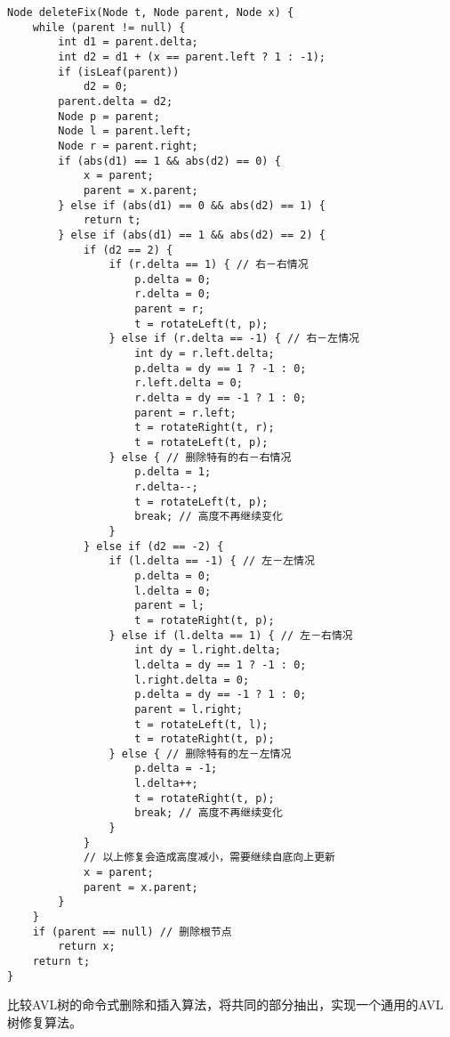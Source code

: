 \documentclass[UTF8]{article}
\begin{document}
\begin{lstlisting}
Node deleteFix(Node t, Node parent, Node x) {
    while (parent != null) {
        int d1 = parent.delta;
        int d2 = d1 + (x == parent.left ? 1 : -1);
        if (isLeaf(parent))
            d2 = 0;
        parent.delta = d2;
        Node p = parent;
        Node l = parent.left;
        Node r = parent.right;
        if (abs(d1) == 1 && abs(d2) == 0) {
            x = parent;
            parent = x.parent;
        } else if (abs(d1) == 0 && abs(d2) == 1) {
            return t;
        } else if (abs(d1) == 1 && abs(d2) == 2) {
            if (d2 == 2) {
                if (r.delta == 1) { // 右－右情况
                    p.delta = 0;
                    r.delta = 0;
                    parent = r;
                    t = rotateLeft(t, p);
                } else if (r.delta == -1) { // 右－左情况
                    int dy = r.left.delta;
                    p.delta = dy == 1 ? -1 : 0;
                    r.left.delta = 0;
                    r.delta = dy == -1 ? 1 : 0;
                    parent = r.left;
                    t = rotateRight(t, r);
                    t = rotateLeft(t, p);
                } else { // 删除特有的右－右情况
                    p.delta = 1;
                    r.delta--;
                    t = rotateLeft(t, p);
                    break; // 高度不再继续变化
                }
            } else if (d2 == -2) {
                if (l.delta == -1) { // 左－左情况
                    p.delta = 0;
                    l.delta = 0;
                    parent = l;
                    t = rotateRight(t, p);
                } else if (l.delta == 1) { // 左－右情况
                    int dy = l.right.delta;
                    l.delta = dy == 1 ? -1 : 0;
                    l.right.delta = 0;
                    p.delta = dy == -1 ? 1 : 0;
                    parent = l.right;
                    t = rotateLeft(t, l);
                    t = rotateRight(t, p);
                } else { // 删除特有的左－左情况
                    p.delta = -1;
                    l.delta++;
                    t = rotateRight(t, p);
                    break; // 高度不再继续变化
                }
            }
            // 以上修复会造成高度减小，需要继续自底向上更新
            x = parent;
            parent = x.parent;
        }
    }
    if (parent == null) // 删除根节点
        return x;
    return t;
}
\end{lstlisting}

\begin{Exercise}
比较AVL树的命令式删除和插入算法，将共同的部分抽出，实现一个通用的AVL树修复算法。
\end{Exercise}

\ifx\wholebook\relax \else


\end{document}
